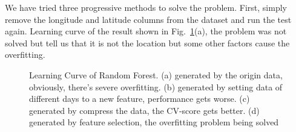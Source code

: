 \documentclass[conference, a4paper]{IEEEtran}
\begin{document}
  We have tried three progressive methods to solve the problem. First, simply remove the longitude and latitude columns from the dataset and run the test again. Learning curve of the result shown in Fig.~\ref{fig:of}(a), the problem was not solved but tell us that it is not the location but some other factors cause the overfitting. 

  \begin{figure}[!htb]
    \centering
  \hfill
    \caption{Learning Curve of Random Forest. (a) generated by the origin data, obviously, there's severe overfitting. (b) generated by setting data of different days to a new feature, performance gets worse. (c) generated by compress the data, the CV-score gets better. (d) generated by feature selection, the overfitting problem being solved}
    \label{fig:of}
  \end{figure}
\end{document}
